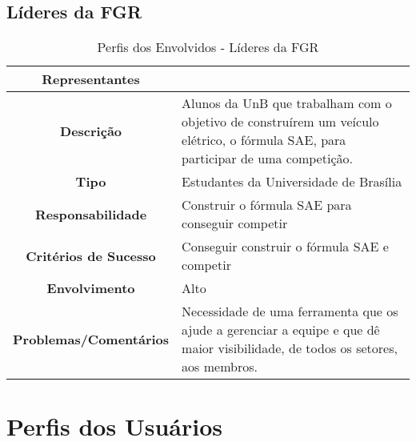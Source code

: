 \begin{apendicesenv}
\pagebreak

\subsection{Líderes da FGR}
\begin{table}[!h]
  \centering
  \caption{Perfis dos Envolvidos - Líderes da FGR}
  \begin{tabular}{|c|l|}
  \hline
  \textbf{Representantes}        &                                                                                                                                  \\ \hline
  \textbf{Descrição}             & \parbox[t]{11cm}{Alunos da UnB que trabalham com o objetivo de construírem um veículo elétrico, o fórmula SAE, para participar de uma competição.} \\ \hline
  \textbf{Tipo}                  & \parbox[t]{11cm}{Estudantes da Universidade de Brasília}                                                                                           \\ \hline
  \textbf{Responsabilidade}      & \parbox[t]{11cm}{Construir o fórmula SAE para conseguir competir}                                                                                  \\ \hline
  \textbf{Critérios de Sucesso}  & \parbox[t]{11cm}{Conseguir construir o fórmula SAE e competir}                                                                                                \\ \hline
  \textbf{Envolvimento}          & Alto                                                                                                                             \\ \hline
  \textbf{Problemas/Comentários} & \parbox[t]{11cm}{Necessidade de uma ferramenta que os ajude a gerenciar a equipe e que dê maior visibilidade, de todos os setores, aos membros.}   \\ \hline
  \end{tabular}
\end{table}

\section{Perfis dos Usuários}

\end{apendicesenv}
